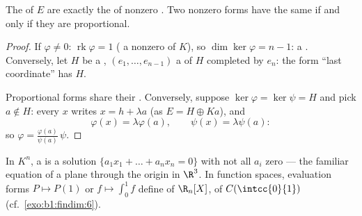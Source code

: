 \begin{theorem}\label{thm:b1:linmaps:hyperplanes}
The  of $E$ are exactly the  of nonzero . Two nonzero forms have the same  if and only if they
are proportional.
\end{theorem}

\begin{proof}
If $\varphi \neq 0$: $\operatorname{rk}\varphi = 1$ ( a nonzero
 of $K$), so $\dim\ker\varphi = n - 1$: a .
Conversely, let $H$ be a , $(e_1, \dots, e_{n-1})$ a 
of $H$ completed by $e_n$: the form ``last coordinate'' has 
$H$.

Proportional forms share their . Conversely, suppose
$\ker\varphi = \ker\psi = H$ and pick $a \notin H$: every $x$ writes
$x = h + \lambda a$ (as $E = H \oplus Ka$), and
\[
\varphi(x) = \lambda \varphi(a), \qquad \psi(x) = \lambda\psi(a):
\]
so $\varphi = \frac{\varphi(a)}{\psi(a)}\,\psi$.
\end{proof}

\begin{example}\label{ex:b1:linmaps:hyperplane}
In $K^n$, a  is a solution  $\{a_1 x_1 + \dots + a_n
x_n = 0\}$ with not all $a_i$ zero --- the familiar equation of a
plane through the origin in $\R^3$. In function spaces, evaluation
forms $P \mapsto P(1)$ or $f \mapsto \int_0^1 f$ define 
of $\R_n[X]$, of $C(\intcc{0}{1})$ (cf.\ \cref{exo:b1:findim:6}).
\end{example}


